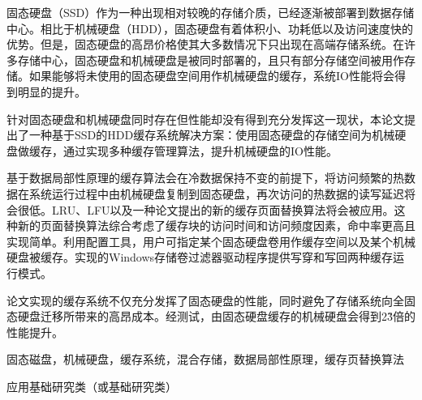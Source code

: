 
\begin{cabstract}

固态硬盘（SSD）作为一种出现相对较晚的存储介质，已经逐渐被部署到数据存储中心。相比于机械硬盘（HDD），固态硬盘有着体积小、功耗低以及访问速度快的优势。但是，固态硬盘的高昂价格使其大多数情况下只出现在高端存储系统。在许多存储中心，固态硬盘和机械硬盘是被同时部署的，且只有部分存储空间被用作存储。如果能够将未使用的固态硬盘空间用作机械硬盘的缓存，系统IO性能将会得到明显的提升。

针对固态硬盘和机械硬盘同时存在但性能却没有得到充分发挥这一现状，本论文提出了一种基于SSD的HDD缓存系统解决方案：使用固态硬盘的存储空间为机械硬盘做缓存，通过实现多种缓存管理算法，提升机械硬盘的IO性能。

基于数据局部性原理的缓存算法会在冷数据保持不变的前提下，将访问频繁的热数据在系统运行过程中由机械硬盘复制到固态硬盘，再次访问的热数据的读写延迟将会很低。LRU、LFU以及一种论文提出的新的缓存页面替换算法将会被应用。这种新的页面替换算法综合考虑了缓存块的访问时间和访问频度因素，命中率更高且实现简单。利用配置工具，用户可指定某个固态硬盘卷用作缓存空间以及某个机械硬盘被缓存。实现的Windows存储卷过滤器驱动程序提供写穿和写回两种缓存运行模式。

论文实现的缓存系统不仅充分发挥了固态硬盘的性能，同时避免了存储系统向全固态硬盘迁移所带来的高昂成本。经测试，由固态硬盘缓存的机械硬盘会得到2\~3倍的性能提升。

\end{cabstract}

\begin{ckeywords}
固态磁盘，机械硬盘，缓存系统，混合存储，数据局部性原理，缓存页替换算法
\end{ckeywords}

\begin{cthesistype}
应用基础研究类（或基础研究类）
\end{cthesistype}


